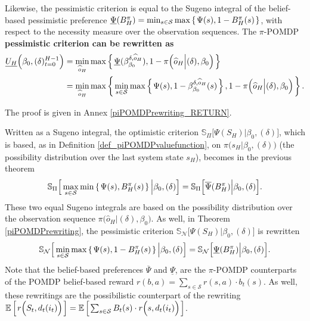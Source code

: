 \begin{theorem}
Likewise, the pessimistic criterion is equal to the Sugeno integral of the belief-based pessimistic preference
$\underline{\Psi}(B^{\pi}_H) = \min_{s \in \mathcal{S}} \max \left\{ \left.  \Psi(s), 1 - B^{\pi}_H(s)  \right. \right\}$,
with respect to the necessity measure over the observation sequences.
The $\pi$-POMDP \textbf{pessimistic criterion can be rewritten as}
\begin{align}
\label{piPOMDPpessrewriting}
\underline{U_H}\Big(\beta_0,(\delta)_{t=0}^{H-1}\Big) &= \min_{\widehat{o}_H} \max \left\{ \left.  \underline{\Psi}(\beta^{\delta,\widehat{o}_H}_{\beta_0}), 1-\pi \Big( \widehat{o}_H \Big\vert (\delta), \beta_0 \Big)  \right. \right\} \\
\nonumber &= \min_{\widehat{o}_H} \max \left\{ \left.   \min_{s \in \mathcal{S}} \max \left\{ \left.  \Psi(s), 1 - \beta^{\delta,\widehat{o}_H}_{\beta_0}(s)  \right. \right\}, 1-\pi \Big( \widehat{o}_H \Big\vert (\delta), \beta_0 \Big)  \right. \right\}.
\end{align}
\end{theorem}
The proof is given in Annex \ref{piPOMDPrewriting_RETURN}.

Written as a Sugeno integral, the optimistic criterion $\mathbb{S}_{\Pi} \Big[ \Psi(S_H) \Big\vert \beta_0, (\delta) \Big]$,
which is based, as in Definition \ref{def_piPOMDPvaluefunction}, on $\pi \Big( s_H \Big\vert \beta_0, (\delta) \Big)$ (the possibility distribution over the last system state $s_H$), 
becomes in the previous theorem
\[  \mathbb{S}_{\Pi} \Big[ \max_{s \in \mathcal{S}} \min \left\{ \left. \Psi(s), B^{\pi}_H(s)   \right. \right\} \Big\vert \beta_0, (\delta) \Big] = \mathbb{S}_{\Pi} \Big[ \overline{\Psi}(B^{\pi}_H) \Big\vert \beta_0, (\delta) \Big]. \]
These two equal Sugeno integrals are based on the possibility distribution 
over the observation sequence $\pi \Big( \widehat{o}_H \Big\vert (\delta), \beta_0 \Big)$.
As well, in Theorem \ref{piPOMDPrewriting}, 
the pessimistic criterion $\mathbb{S}_{\mathcal{N}} \Big[ \Psi(S_H) \Big\vert \beta_0, (\delta) \Big]$
is rewritten 
\[  \mathbb{S}_{\mathcal{N}} \Big[ \min_{s \in \mathcal{S}} \max \left\{ \left. \Psi(s), 1 - B^{\pi}_H(s)   \right. \right\} \Big\vert \beta_0, (\delta) \Big] 
= \mathbb{S}_{\mathcal{N}} \Big[ \underline{\Psi}(B^{\pi}_H) \Big\vert \beta_0, (\delta) \Big]. \]
Note that the belief-based preferences $\overline{\Psi}$ and $\underline{\Psi}$,
are the $\pi$-POMDP counterparts of the POMDP belief-based reward $r(b,a) = \sum_{s \in \mathcal{S}} r(s,a) \cdot b_t(s)$.
As well, these rewritings are the possibilistic counterpart of 
the rewriting $\mathbb{E} \left[ \left.  r\Big(S_t, d_t(i_t) \Big)  \right. \right] = \mathbb{E} \left[ \left.  \sum_{s \in \mathcal{S}} B_t(s) \cdot r\Big(s,d_t(i_t)\Big)  \right. \right]$.

